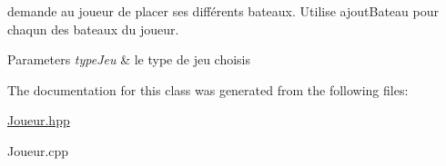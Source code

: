 demande au joueur de placer ses différents bateaux. Utilise ajout\+Bateau pour chaqun des bateaux du joueur. 


\begin{DoxyParams}{Parameters}
{\em type\+Jeu} & le type de jeu choisis \\
\hline
\end{DoxyParams}


The documentation for this class was generated from the following files\+:\begin{DoxyCompactItemize}
\item 
\mbox{\hyperlink{_joueur_8hpp}{Joueur.\+hpp}}\item 
Joueur.\+cpp\end{DoxyCompactItemize}
